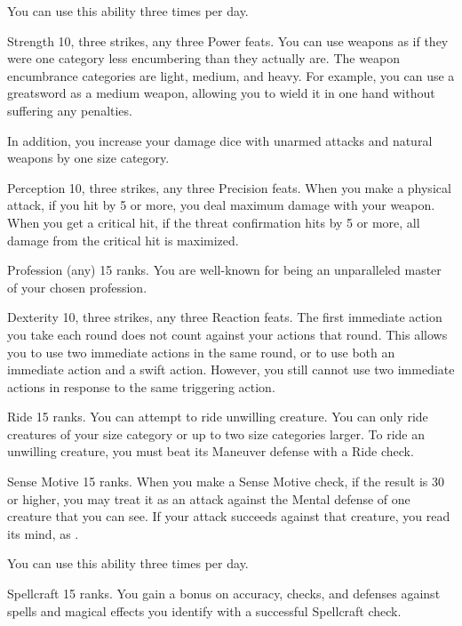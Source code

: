 You can use this ability three times per day.

\featpres Strength 10, three strikes, any three Power feats.
\featben You can use weapons as if they were one category less encumbering than they actually are.
The weapon encumbrance categories are light, medium, and heavy.
For example, you can use a greatsword as a medium weapon, allowing you to wield it in one hand without suffering any penalties.

In addition, you increase your damage dice with unarmed attacks and natural weapons by one size category.

\featpres Perception 10, three strikes, any three Precision feats.
\featben When you make a physical attack, if you hit by 5 or more, you deal maximum damage with your weapon.
When you get a critical hit, if the threat confirmation hits by 5 or more, all damage from the critical hit is maximized.

\featpre Profession (any) 15 ranks.
\featben You are well-known for being an unparalleled master of your chosen profession.

\featpres Dexterity 10, three strikes, any three Reaction feats.
\featben The first immediate action you take each round does not count against your actions that round.
This allows you to use two immediate actions in the same round, or to use both an immediate action and a swift action.
However, you still cannot use two immediate actions in response to the same triggering action.

\featpre Ride 15 ranks.
\featben You can attempt to ride unwilling creature.
You can only ride creatures of your size category or up to two size categories larger.
To ride an unwilling creature, you must beat its Maneuver defense with a Ride check.

\featpre Sense Motive 15 ranks.
\featben When you make a Sense Motive check, if the result is 30 or higher, you may treat it as an attack against the Mental defense of one creature that you can see.
If your attack succeeds against that creature, you read its mind, as .

You can use this ability three times per day.

\featpre Spellcraft 15 ranks.
\featben You gain a  bonus on accuracy, checks, and defenses against spells and magical effects you identify with a successful Spellcraft check.

